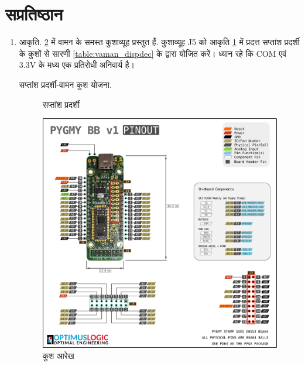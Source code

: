 \documentclass[journal,12pt,twocolumn]{IEEEtran}
\renewcommand\thesection{\arabic{section}}
\begin{document}
\section{सप्रतिष्ठान}
\renewcommand{\theequation}{\theenumi}
\renewcommand{\thefigure}{\theenumi}
\begin{enumerate}[label=\thesection.\arabic*.,ref=\thesection.\theenumi]


\item आकृति. \ref{fig:pin_sheet} में  वामन के समस्त कुशाव्यूह  प्रस्तुत हैं.  कुशाव्यूह J5 को  आकृति \ref{fig:sevenseg} में प्रदत्त सप्तांश प्रदर्शी के कुशों से सारणी \ref{table:vaman_dispdec} के द्वारा योजित करें। ध्यान  रहे कि COM एवं 3.3V के मध्य एक प्रतिरोधी अनिवार्य है। 
\begin{table}[!ht]
\centering
\parbox{.45\columnwidth}{

}
\hfill
\parbox{.45\columnwidth}{

}
\caption{सप्तांश प्रदर्शी-वामन कुश योजना.}
\label{table:vaman_dispdec}
\end{table}

\begin{figure}[!ht]
\centering
\resizebox{\columnwidth}{!}{

}
\caption{सप्तांश प्रदर्शी}
\label{fig:sevenseg}
\end{figure}


\begin{figure}[!ht]
\centering
\includegraphics[width = \textwidth]{figs/pin_sheet.png}
\caption{कुश आरेख}
\label{fig:pin_sheet}
\end{figure}


\end{enumerate}
\end{document}
